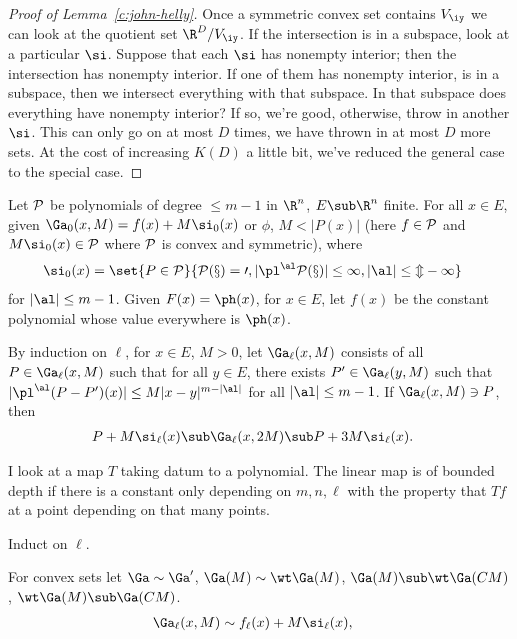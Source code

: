\begin{proof}[Proof of Lemma~\ref{c:john-helly}]
Once a symmetric convex set contains $V_\iy$ we can look at the quotient set $\R^D/V_\iy$. If the intersection is in a subspace, look at a particular $\si$. 
Suppose \bwoc that each $\si$ has nonempty interior; then the intersection has nonempty interior. If one of them has nonempty interior, is in a subspace, then we intersect everything with that subspace. In that subspace does everything have nonempty interior? If so, we're good, otherwise, throw in another $\si$. This can only go on at most $D$ times, we have thrown in at most $D$ more sets. At the cost of increasing $K(D)$ a little bit, we've reduced the general case to the special case.
\end{proof}
Let $\cal P$ be polynomials of degree $\le m-1$ in $\R^n$, $E\sub \R^n$ finite. For all $x\in E$, given $\Ga_0(x, M) = f(x)+M\si_0(x)$ or $\phi$, $M<|P(x)|$ (here $f\in \cal P$ and $M\si_0(x)\in \cal P$ where $\cal P$ is convex and symmetric), where
\begin{align}
\si_0(x) &= \set{P\in \cal P}{P(x)=0,|\pl^\al P(x)|\le 1, |\al|\le m-1}
\end{align}
for $|\al|\le m-1$.
 Given $F(x) = \ph(x)$, for $x\in E$, let $f(x)$ be the constant polynomial whose value everywhere is $\ph(x)$.

By induction on $\ell$, for $x\in E$, $M>0$, let $\Ga_\ell(x,M)$ consists of all $P\in \Ga_\ell(x,M)$ such that for all $y\in E$, there exists $P'\in \Ga_\ell(y,M)$ such that $|\pl^\al (P-P')(x)|\le M|x-y|^{m-|\al|}$ for all $|\al|\le m-1$.
If $\Ga_\ell(x,M)\ni P$, then
\begin{align}
P+M\si_\ell(x) &\sub \Ga_\ell(x,2M)\sub P + 3M \si_\ell(x).
\end{align}

I look at a map $T$ taking datum to a polynomial.
%
The linear map is of bounded depth if there is a constant only depending on $m,n,\ell$ with the property that $Tf$ at a point depending on that many points.

Induct on $\ell$.

For convex sets let $\Ga \sim \Ga'$, $\Ga(M)\sim \wt \Ga(M)$, $\Ga(M) \sub \wt \Ga(CM)$, $\wt \Ga(M) \sub\Ga(CM)$.
\begin{align}
\Ga_\ell(x,M) &\sim f_\ell(x) + M\si_\ell(x),
\end{align}

